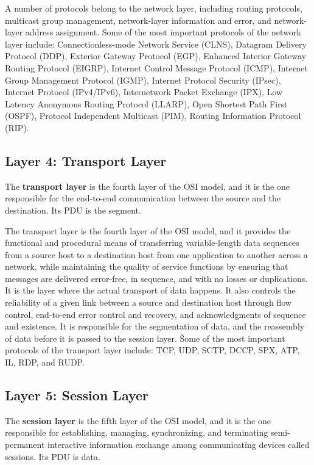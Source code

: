 A number of protocols belong to the network layer, including routing protocols, multicast group management,
network-layer information and error, and network-layer address assignment. Some of the most important protocols of the
network layer include: Connectionless-mode Network Service (CLNS), Datagram Delivery Protocol (DDP), Exterior Gateway
Protocol (EGP), Enhanced Interior Gateway Routing Protocol (EIGRP), Internet Control Message Protocol (ICMP),
Internet Group Management Protocol (IGMP), Internet Protocol Security (IPsec), Internet Protocol (IPv4/IPv6),
Internetwork Packet Exchange (IPX), Low Latency Anonymous Routing Protocol (LLARP), Open Shortest Path First (OSPF),
Protocol Independent Multicast (PIM), Routing Information Protocol (RIP).

\subsection{Layer 4: Transport Layer}

The \textbf{transport layer} is the fourth layer of the OSI model, and it is the one responsible for the end-to-end
communication between the source and the destination. Its PDU is the segment.
\ed

The transport layer is the fourth layer of the OSI model, and it provides the functional and procedural means of
transferring variable-length data sequences from a source host to a destination host from one application to another
across a network, while maintaining the quality of service functions by ensuring that messages are delivered error-free,
in sequence, and with no losses or duplications. It is the layer where the actual transport of data happens. It also
controls the reliability of a given link between a source and destination host through flow control, end-to-end error
control and recovery, and acknowledgments of sequence and existence. It is responsible for the segmentation of data,
and the reassembly of data before it is passed to the session layer. \v

Some of the most important protocols of the transport layer include: TCP, UDP, SCTP, DCCP, SPX, ATP, IL, RDP, and
RUDP\@.

\subsection{Layer 5: Session Layer}

The \textbf{session layer} is the fifth layer of the OSI model, and it is the one responsible for establishing,
managing, synchronizing, and terminating semi-permanent interactive information exchange among communicating devices
called sessions. Its PDU is data.
\ed

